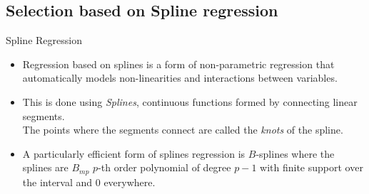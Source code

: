 \documentclass[handout]{beamer}
\begin{document}
\subsection{Selection based on Spline regression}

\begin{frame}{Spline Regression}
\begin{itemize}

\item Regression based on splines is a form of non-parametric
  regression that automatically models non-linearities and
  interactions between variables.
\item This is done using \emph{Splines},  continuous functions formed by connecting linear
segments. \\ The points where the segments connect are called the \emph{knots} of the spline.
\item A particularly efficient form of splines regression is  $B$-splines where the splines are  $B_{mp}$ $p$-th order polynomial of degree $p-1$ with finite support over the interval and 0 everywhere.
    
\end{itemize}
\end{frame}

\end{document}
